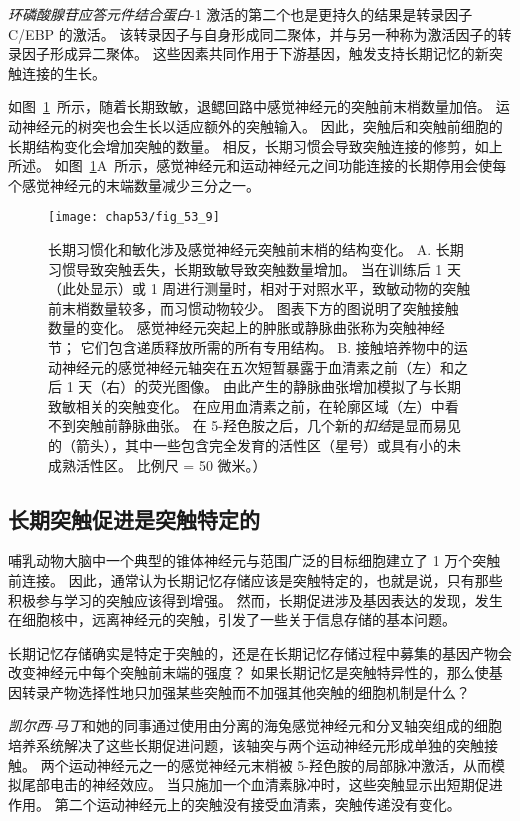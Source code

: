 \textit{环磷酸腺苷应答元件结合蛋白}-1 激活的第二个也是更持久的结果是转录因子 C/EBP 的激活。
该转录因子与自身形成同二聚体，并与另一种称为激活因子的转录因子形成异二聚体。
这些因素共同作用于下游基因，触发支持长期记忆的新突触连接的生长。


如图~\ref{fig:53_9}~所示，随着长期致敏，退鳃回路中感觉神经元的突触前末梢数量加倍。
运动神经元的树突也会生长以适应额外的突触输入。
因此，突触后和突触前细胞的长期结构变化会增加突触的数量。
相反，长期习惯会导致突触连接的修剪，如上所述。
如图~\ref{fig:53_9}A~所示，感觉神经元和运动神经元之间功能连接的长期停用会使每个感觉神经元的末端数量减少三分之一。


\begin{figure}[htbp]
	\centering
	\texttt{[image: chap53/fig\_53\_9]}
	\caption{长期习惯化和敏化涉及感觉神经元突触前末梢的结构变化。
		A. 长期习惯导致突触丢失，长期致敏导致突触数量增加。
		当在训练后 1 天（此处显示）或 1 周进行测量时，相对于对照水平，致敏动物的突触前末梢数量较多，而习惯动物较少。
		图表下方的图说明了突触接触数量的变化。
		感觉神经元突起上的肿胀或静脉曲张称为突触神经节；
		它们包含递质释放所需的所有专用结构\cite{bailey1983morphological}。
		B. 接触培养物中的运动神经元的感觉神经元轴突在五次短暂暴露于血清素之前（左）和之后 1 天（右）的荧光图像。
		由此产生的静脉曲张增加模拟了与长期致敏相关的突触变化。
		在应用血清素之前，在轮廓区域（左）中看不到突触前静脉曲张。
		在 5-羟色胺之后，几个新的\textit{扣结}是显而易见的（箭头），其中一些包含完全发育的活性区（星号）或具有小的未成熟活性区。
		比例尺 = 50 微米\cite{glanzman1990target}。）}
	\label{fig:53_9}
\end{figure}



\subsection{长期突触促进是突触特定的}

哺乳动物大脑中一个典型的锥体神经元与范围广泛的目标细胞建立了 1 万个突触前连接。
因此，通常认为长期记忆存储应该是突触特定的，也就是说，只有那些积极参与学习的突触应该得到增强。
然而，长期促进涉及基因表达的发现，发生在细胞核中，远离神经元的突触，引发了一些关于信息存储的基本问题。


长期记忆存储确实是特定于突触的，还是在长期记忆存储过程中募集的基因产物会改变神经元中每个突触前末端的强度？
如果长期记忆是突触特异性的，那么使基因转录产物选择性地只加强某些突触而不加强其他突触的细胞机制是什么？


\textit{凯尔西$\cdot$马丁}和她的同事通过使用由分离的海兔感觉神经元和分叉轴突组成的细胞培养系统解决了这些长期促进问题，该轴突与两个运动神经元形成单独的突触接触。
两个运动神经元之一的感觉神经元末梢被 5-羟色胺的局部脉冲激活，从而模拟尾部电击的神经效应。
当只施加一个血清素脉冲时，这些突触显示出短期促进作用。
第二个运动神经元上的突触没有接受血清素，突触传递没有变化。


